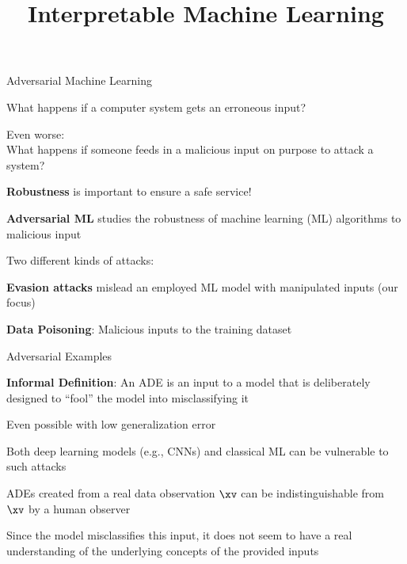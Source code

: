 \documentclass[10pt,compress,t,notes=noshow, xcolor=table]{beamer}
\title{Interpretable Machine Learning}
\begin{document}
\newcommand{\vertiii}[1]{{\left\vert\kern-0.25ex\left\vert\kern-0.25ex\left\vert #1 \right\vert\kern-0.25ex\right\vert\kern-0.25ex\right\vert}}





\begin{framei}[align=top]{Adversarial Machine Learning}
\item What happens if a computer system gets an erroneous input?
\item Even worse:\\ What happens if someone feeds in a malicious input on purpose to attack a system?
\item[$\leadsto$] \textbf{Robustness} is important to ensure a safe service!
\item \textbf{Adversarial ML} studies the robustness of machine learning (ML) algorithms to malicious input
\item Two different kinds of attacks:
\begin{itemizeS}
\item \textbf{Evasion attacks} mislead an employed ML model with manipulated inputs (our focus)
\item \textbf{Data Poisoning}: Malicious inputs to the training dataset
\end{itemizeS}
\end{framei}


\begin{framei}[align=top]{Adversarial Examples}
\item \textbf{Informal Definition}: An ADE is an input to a model that is deliberately designed to ``fool'' the model into misclassifying it
\item Even possible with low generalization error
\item Both deep learning models (e.g., CNNs) and classical ML can be vulnerable to such attacks
\item ADEs created from a real data observation $\xv$ can be indistinguishable from $\xv$ by a human observer
\item Since the model misclassifies this input, it does not seem to have a real understanding of the underlying concepts of the provided inputs
\end{framei}
\end{document}
